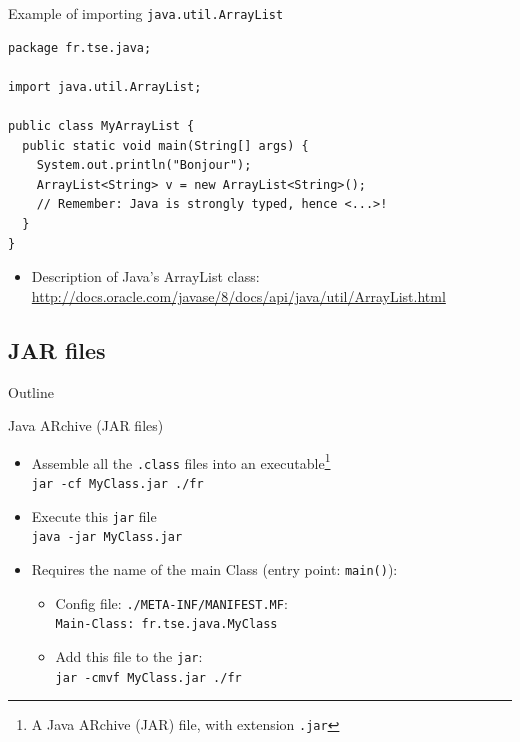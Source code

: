 \documentclass[English,c,%
hyperref={%
    pdftitle={FISA-DE2 OOP in Java},%
    pdfauthor={Muller, Gravier, Laforest, Subercaze},%
    pdfsubject={OOP in Java},%
    pdfkeywords={OOP, Java},%
    colorlinks=true,%
    urlcolor=blue,%
    linkcolor=%
    },%
xcolor={pdftex,svgnames} %
]{beamer}
\begin{document}
\begin{frame}[fragile]{Example of importing \texttt{java.util.ArrayList}}

\begin{lstlisting}[escapechar=\%,label=myarraylistpackage,caption=MyArrayList.java]
package fr.tse.java;

import java.util.ArrayList;

public class MyArrayList {
  public static void main(String[] args) {
    System.out.println("Bonjour");
    ArrayList<String> v = new ArrayList<String>();
    // Remember: Java is strongly typed, hence <...>!
  }
}
\end{lstlisting}

  \bigskip
\begin{itemize}
  \item Description of Java's ArrayList class:\\
  \url{http://docs.oracle.com/javase/8/docs/api/java/util/ArrayList.html}
\end{itemize}

\end{frame}


\subsection{JAR files}
   \begin{frame}{Outline}
       \tableofcontents[currentsubsection]
   \end{frame}

\begin{frame}{Java ARchive (JAR files)}
\begin{itemize}
    \item Assemble all the \texttt{.class} files into an executable\footnote{A Java ARchive (JAR) file, with extension \texttt{.jar}}\\
    \texttt{jar -cf MyClass.jar ./fr}
    \pause
    \medskip
    \item Execute this \texttt{jar} file\\
    \texttt{java -jar MyClass.jar}
    \pause
    \medskip
    \item Requires the name of the main Class (entry point: \texttt{main()}):
    \begin{itemize}
      \item Config file: \texttt{./META-INF/MANIFEST.MF}:\\
      \texttt{Main-Class: fr.tse.java.MyClass}
      \item Add this file to the \texttt{jar}:\\
      \texttt{jar -cmvf MyClass.jar ./fr}
    \end{itemize}
\end{itemize}
\end{frame}
\end{document}
